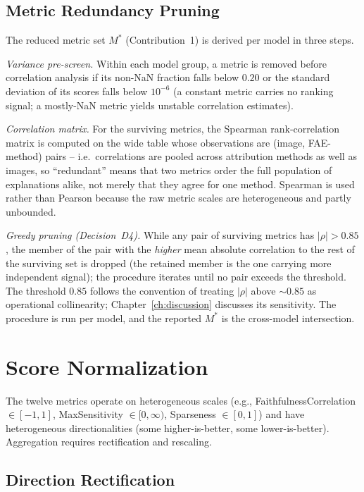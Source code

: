 \subsection{Metric Redundancy Pruning}
\label{subsec:redundancy-pruning}

The reduced metric set $M^{*}$ (Contribution~1) is derived per model in
three steps.

\emph{Variance pre-screen.} Within each model group, a metric is removed
before correlation analysis if its non-NaN fraction falls below $0.20$ or
the standard deviation of its scores falls below $10^{-6}$ (a constant
metric carries no ranking signal; a mostly-NaN metric yields unstable
correlation estimates).

\emph{Correlation matrix.} For the surviving metrics, the Spearman
rank-correlation matrix is computed on the wide table whose observations
are (image, FAE-method) pairs -- i.e.\ correlations are pooled across
attribution methods as well as images, so ``redundant'' means that two
metrics order the full population of explanations alike, not merely that
they agree for one method. Spearman is used rather than Pearson because
the raw metric scales are heterogeneous and partly unbounded.

\emph{Greedy pruning (Decision~D4).} While any pair of surviving metrics
has $|\rho| > 0.85$, the member of the pair with the \emph{higher} mean
absolute correlation to the rest of the surviving set is dropped (the
retained member is the one carrying more independent signal); the
procedure iterates until no pair exceeds the threshold. The threshold
$0.85$ follows the convention of treating $|\rho|$ above ${\sim}0.85$ as
operational collinearity; Chapter~\ref{ch:discussion} discusses its
sensitivity. The procedure is run per model, and the reported $M^{*}$ is
the cross-model intersection.

\section{Score Normalization}
\label{sec:normalization}

The twelve metrics operate on heterogeneous scales (e.g.,
FaithfulnessCorrelation $\in [-1, 1]$, MaxSensitivity $\in [0, \infty)$,
Sparseness $\in [0, 1]$) and have heterogeneous directionalities (some
higher-is-better, some lower-is-better). Aggregation requires
rectification and rescaling.

\subsection{Direction Rectification}

